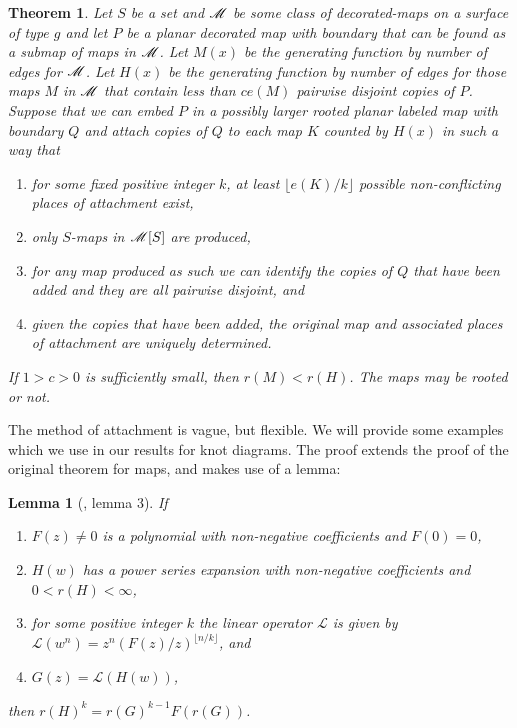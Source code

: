 \documentclass[amsmath,longbibliography,secnumarabic,floatfix,amssymb,nofootinbib,nobibnotes,letterpaper,11pt,tightenlines,notitlepage,showkeys,showlabels]{amsart}%
\newtheorem{theorem}{Theorem}
\newtheorem*{lemma*}{Lemma}
\theoremstyle{definition}
\begin{document}
\begin{theorem}Let $S$ be a set and $\mathscr{M}$ be some class of
  decorated-maps on a surface of type $g$ and let $P$ be a planar
  decorated map
  with boundary that can be found as a submap of maps in
  $\mathscr{M}$. Let $M(x)$ be the generating function by number of
  edges for $\mathscr{M}$. Let $H(x)$ be the generating function by
  number of edges for those maps $M$ in $\mathscr{M}$ that contain
  less than $ce(M)$ pairwise disjoint copies of $P$. Suppose that we
  can embed $P$ in a possibly larger rooted planar labeled map with
  boundary $Q$ and attach copies of $Q$ to each map $K$
  counted by $H(x)$ in such a way that
  \begin{enumerate}
  \item for some fixed positive integer $k$, at least $\lfloor e(K)/k \rfloor$ possible
    non-conflicting places of attachment exist,
  \item only $S$-maps in $\mathscr{M}[S]$ are produced,
  \item for any map produced as such we can identify the copies of $Q$ that have been added and they
    are all pairwise disjoint, and
  \item given the copies that have been added, the original map and associated places of attachment
    are uniquely determined.
  \end{enumerate} If $1 > c > 0$ is sufficiently small, then $r(M) < r(H)$. The maps may be rooted or
  not.
  \label{thr:weakpattern}
\end{theorem}

The method of attachment is vague, but flexible. We will provide some examples which we use in our
results for knot diagrams. The proof extends the proof of the original theorem for maps, and makes
use of a lemma:


\begin{lemma*}[\cite{Bender1992104}, lemma 3]
 If
 \begin{enumerate}
 \item $F(z) \ne 0$ is a polynomial with non-negative coefficients and $F(0) = 0$,
 \item $H(w)$ has a power series expansion with non-negative coefficients and $0 < r(H) < \infty$,
 \item for some positive integer $k$ the linear operator $\mathscr{L}$ is given by $\mathscr{L}(w^n)
   = z^n(F(z)/z)^{\lfloor n/k \rfloor}$, and
 \item $G(z) = \mathscr{L}(H(w))$,
 \end{enumerate}
 then $r(H)^k = r(G)^{k-1}F(r(G))$.
\end{lemma*}
\end{document}
